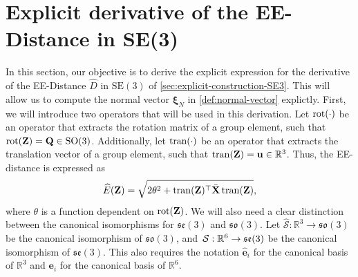 \section{Explicit derivative of the EE-Distance in SE(3)}\label{app:explicit-derivative-SE3}
In this section, our objective is to derive the explicit expression for the derivative of the EE-Distance $\widehat{D}$ in $\text{SE}(3)$ of \cref{sec:explicit-construction-SE3}. This will allow us to compute the normal vector $\boldsymbol{\xi}_N$ in \cref{def:normal-vector} explictly. First, we will introduce two operators that will be used in this derivation. Let $\operatorname{rot}(\cdot)$ be an operator that extracts the rotation matrix of a group element, such that $\operatorname{rot}(\mathbf{Z})=\mathbf{Q}\in\text{SO}(3)$. Additionally, let $\operatorname{tran}(\cdot)$ be an operator that extracts the translation vector of a group element, such that $\operatorname{tran}(\mathbf{Z})=\mathbf{u}\in\mathbb{R}^3$. Thus, the EE-distance is expressed as
\begin{align}
    \widehat{E}(\mathbf{Z}) = \sqrt{2\theta^2 + \operatorname{tran}(\mathbf{Z})^\top\bar{\mathbf{X}}\operatorname{tran}(\mathbf{Z})},
\end{align}
where $\theta$ is a function dependent on $\operatorname{rot}(\mathbf{Z})$. We will also need a clear distinction between the canonical isomorphisms for $\mathfrak{se}(3)$ and $\mathfrak{so}(3)$. Let $\widehat{\mathcal{S}}:\mathbb{R}^3\to\mathfrak{so}(3)$ be the canonical isomorphism of $\mathfrak{so}(3)$, and $\SL:\mathbb{R}^6\to\mathfrak{se}(3)$ be the canonical isomorphism of $\mathfrak{se}(3)$. This also requires the notation $\widehat{\mathbf{e}}_i$ for the canonical basis of $\mathbb{R}^3$ and $\mathbf{e}_i$ for the canonical basis of $\mathbb{R}^6$.

